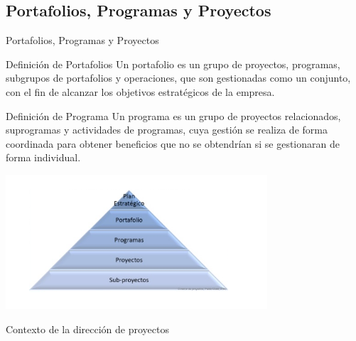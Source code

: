\subsection{Portafolios, Programas y Proyectos}
\begin{frame}[allowframebreaks]{Portafolios, Programas y Proyectos}
	
	\begin{block}{Definición de Portafolios}
		Un portafolio es un grupo de proyectos, programas, subgrupos de  portafolios y operaciones, que son gestionadas como un conjunto, con el fin de alcanzar los objetivos estratégicos de la empresa.
	\end{block}


	\framebreak

	\begin{block}{Definición de Programa}
		Un programa es un grupo de proyectos relacionados, suprogramas y actividades de programas, cuya gestión se realiza de forma coordinada para obtener beneficios que no se obtendrían si se gestionaran de forma individual.
	\end{block}


	\framebreak
	\begin{center}
		\includegraphics[height=5cm]{figuras/proy_prog_port_00.png}

		Contexto de la dirección de proyectos
	\end{center}

\end{frame}


